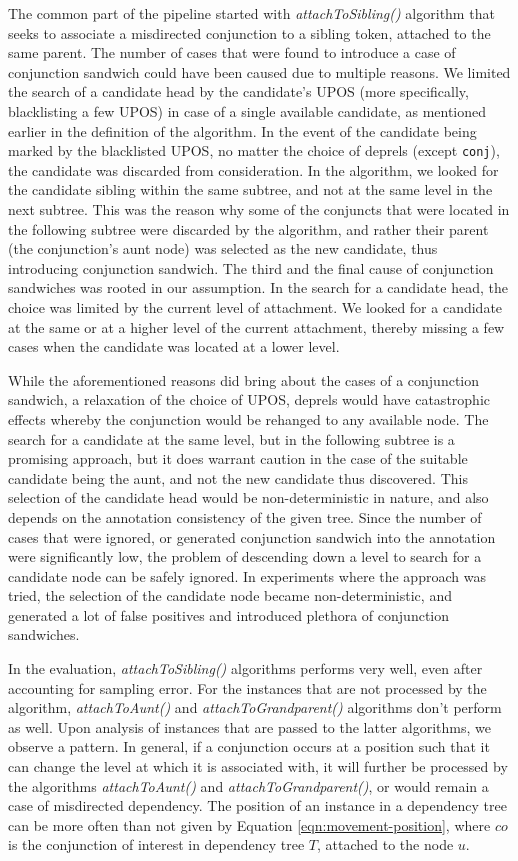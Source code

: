 The common part of the pipeline started with \textit{attachToSibling()} algorithm that seeks to associate a misdirected conjunction to a sibling token, attached to the same parent. The number of cases that were found to introduce a case of conjunction sandwich could have been caused due to multiple reasons. We limited the search of a candidate head by the candidate's UPOS (more specifically, blacklisting a few UPOS) in case of a single available candidate, as mentioned earlier in the definition of the algorithm. In the event of the candidate being marked by the blacklisted UPOS, no matter the choice of deprels (except \verb|conj|), the candidate was discarded from consideration. In the algorithm, we looked for the candidate sibling within the same subtree, and not at the same level in the next subtree. This was the reason why some of the conjuncts that were located in the following subtree were discarded by the algorithm, and rather their parent (the conjunction's aunt node) was selected as the new candidate, thus introducing conjunction sandwich. The third and the final cause of conjunction sandwiches was rooted in our assumption. In the search for a candidate head, the choice was limited by the current level of attachment. We looked for a candidate at the same or at a higher level of the current attachment, thereby missing a few cases when the candidate was located at a lower level.

While the aforementioned reasons did bring about the cases of a conjunction sandwich, a relaxation of the choice of UPOS, deprels would have catastrophic effects whereby the conjunction would be rehanged to any available node. The search for a candidate at the same level, but in the following subtree is a promising approach, but it does warrant caution in the case of the suitable candidate being the aunt, and not the new candidate thus discovered. This selection of the candidate head would be non-deterministic in nature, and also depends on the annotation consistency of the given tree. Since the number of cases that were ignored, or generated conjunction sandwich into the annotation were significantly low, the problem of descending down a level to search for a candidate node can be safely ignored. In experiments where the approach was tried, the selection of the candidate node became non-deterministic, and generated a lot of false positives and introduced plethora of conjunction sandwiches.

In the evaluation, \textit{attachToSibling()} algorithms performs very well, even after accounting for sampling error. For the instances that are not processed by the algorithm, \textit{attachToAunt()} and \textit{attachToGrandparent()} algorithms don't perform as well. Upon analysis of instances that are passed to the latter algorithms, we observe a pattern. In general, if a conjunction occurs at a position such that it can change the level at which it is associated with, it will further be processed by the algorithms \textit{attachToAunt()} and \textit{attachToGrandparent()}, or would remain a case of misdirected dependency. The position of an instance in a dependency tree can be more often than not given by Equation \ref{eqn:movement-position}, where $co$ is the conjunction of interest in dependency tree $T$, attached to the node $u$.

